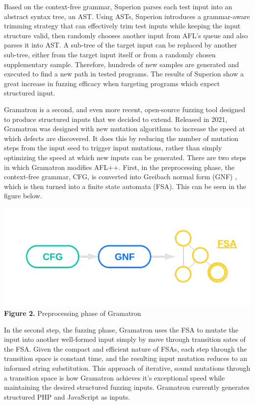 \documentclass[12pt]{diazessay}
\begin{document}
Based on the context-free grammar, Superion parses each test input into an abstract syntax tree, an AST. Using ASTs, Superion introduces a grammar-aware trimming strategy that can effectively trim test inputs while keeping the input structure valid, then randomly chooses another input from AFL's queue and also parses it into AST. A sub-tree of the target input can be replaced by another sub-tree, either from the target input itself or from a randomly chosen supplementary sample. Therefore, hundreds of new samples are generated and executed to find a new path in tested programs. The results of Superion show a great increase in fuzzing efficacy when targeting programs which expect structured input.


\clearpage

Gramatron\cite{srivastava2021gramatron} is a second, and even more recent, open-source fuzzing tool designed to produce structured inputs that we decided to extend.
Released in 2021, Gramatron was designed with new mutation algorithms to increase the speed at which defects are discovered.
It does this by reducing the number of mutation steps from the input seed to trigger input mutations, rather than simply optimizing the speed at which new inputs can be generated. There are two steps in which Gramatron modifies AFL++. First, in the preprocessing phase, the context-free grammar, CFG, is converted into Greibach normal form (GNF) \cite{greibach1965new}, which is then turned into a finite state automata (FSA). This can be seen in the figure below.

\vspace{-1cm}
\begin{center}
	\includegraphics[scale=0.4, trim={0 3cm 0 0}, clip]{gramatronfig.png}\\
	\textbf{Figure 2.} Preprocessing phase of Gramatron
\end{center}
\vspace{6mm}

In the second step, the fuzzing phase, Gramatron uses the FSA to mutate the input into another well-formed input simply by move through transition sates of the FSA.
Given the compact and efficient nature of FSAs, each step through the transition space is constant time, and the resulting input mutation reduces to an informed string substitution.
This approach of iterative, sound mutations through a transition space is how Gramatron achieves it's exceptional speed while maintaining the desired structured fuzzing inputs.
Gramatron currently generates structured PHP and JavaScript as inputs.
\end{document}

